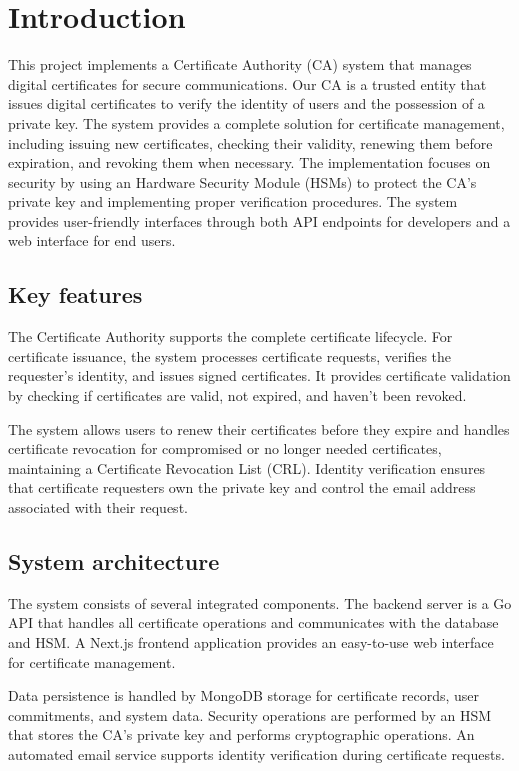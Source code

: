 \chapter{Introduction}
\label{ch:introduction}
This project implements a Certificate Authority (CA) system that manages digital certificates for 
secure communications. Our CA is a trusted entity that issues digital certificates to verify the identity 
of users and the possession of a private key.
The system provides a complete solution for certificate management, including issuing new certificates, 
checking their validity, renewing them before expiration, and revoking them when necessary. 
The implementation focuses on security by using an Hardware Security Module (HSMs) to protect
the CA's private key and implementing proper verification procedures.
The system provides user-friendly interfaces through both API endpoints for developers and a web 
interface for end users. 

\section{Key features}

The Certificate Authority supports the complete certificate lifecycle. 
For certificate issuance, the system processes certificate requests, verifies the requester's identity, 
and issues signed certificates. 
It provides certificate validation by checking if certificates are valid, not expired, and haven't been revoked.

The system allows users to renew their certificates before they expire and handles certificate revocation 
for compromised or no longer needed certificates, maintaining a Certificate Revocation List (CRL). 
Identity verification ensures that certificate requesters own the private key and control the email 
address associated with their request.

\section{System architecture}

The system consists of several integrated components. The backend server is a Go API that handles 
all certificate operations and communicates with the database and HSM. 
A Next.js frontend application provides an easy-to-use web interface for certificate management.

Data persistence is handled by MongoDB storage for certificate records, user commitments, and system data. 
Security operations are performed by an HSM that stores the CA's private key 
and performs cryptographic operations. 
An automated email service supports identity verification during certificate requests.

